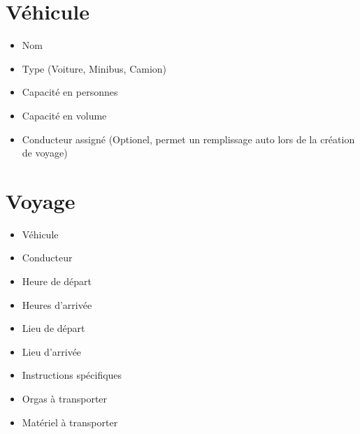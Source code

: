 \section{Véhicule}
\begin{itemize}
\item Nom
\item Type (Voiture, Minibus, Camion)
\item Capacité en personnes
\item Capacité en volume
\item Conducteur assigné (Optionel, permet un remplissage auto lors de la création de voyage)

\end{itemize}

\section{Voyage}
\begin{itemize}
\item Véhicule
\item Conducteur
\item Heure de départ
\item Heures d'arrivée
\item Lieu de départ
\item Lieu d'arrivée
\item Instructions spécifiques
\item Orgas à transporter
\item Matériel à transporter
\end{itemize}

